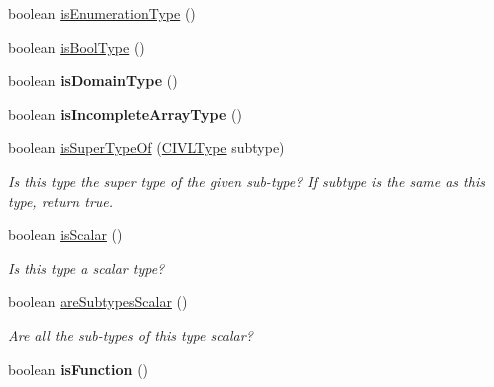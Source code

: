 \begin{DoxyCompactItemize}
boolean \hyperlink{classedu_1_1udel_1_1cis_1_1vsl_1_1civl_1_1model_1_1common_1_1type_1_1CommonType_ae9cfcaa4efb6acb13c7e1f817f3e49a4}{is\+Enumeration\+Type} ()
\item 
boolean \hyperlink{classedu_1_1udel_1_1cis_1_1vsl_1_1civl_1_1model_1_1common_1_1type_1_1CommonType_a5d39059f524a3eee06aa1b9141c5b8c1}{is\+Bool\+Type} ()
\item 
\hypertarget{classedu_1_1udel_1_1cis_1_1vsl_1_1civl_1_1model_1_1common_1_1type_1_1CommonType_a34e43921755bba4604d7af4d115d60d7}{}boolean {\bfseries is\+Domain\+Type} ()\label{classedu_1_1udel_1_1cis_1_1vsl_1_1civl_1_1model_1_1common_1_1type_1_1CommonType_a34e43921755bba4604d7af4d115d60d7}

\item 
\hypertarget{classedu_1_1udel_1_1cis_1_1vsl_1_1civl_1_1model_1_1common_1_1type_1_1CommonType_a9ffa2150d1dee7fbbe569e8c137325a0}{}boolean {\bfseries is\+Incomplete\+Array\+Type} ()\label{classedu_1_1udel_1_1cis_1_1vsl_1_1civl_1_1model_1_1common_1_1type_1_1CommonType_a9ffa2150d1dee7fbbe569e8c137325a0}

\item 
boolean \hyperlink{classedu_1_1udel_1_1cis_1_1vsl_1_1civl_1_1model_1_1common_1_1type_1_1CommonType_a67017012c5ca1fc1586041055d7769b0}{is\+Super\+Type\+Of} (\hyperlink{interfaceedu_1_1udel_1_1cis_1_1vsl_1_1civl_1_1model_1_1IF_1_1type_1_1CIVLType}{C\+I\+V\+L\+Type} subtype)
\begin{DoxyCompactList}\small\item\em Is this type the super type of the given sub-\/type? If subtype is the same as this type, return true. \end{DoxyCompactList}\item 
boolean \hyperlink{classedu_1_1udel_1_1cis_1_1vsl_1_1civl_1_1model_1_1common_1_1type_1_1CommonType_a4ac1aa331a9d49338f718038f51df2f8}{is\+Scalar} ()
\begin{DoxyCompactList}\small\item\em Is this type a scalar type? \end{DoxyCompactList}\item 
boolean \hyperlink{classedu_1_1udel_1_1cis_1_1vsl_1_1civl_1_1model_1_1common_1_1type_1_1CommonType_a6f47a50e9964e78df245b60b4ddbf81c}{are\+Subtypes\+Scalar} ()
\begin{DoxyCompactList}\small\item\em Are all the sub-\/types of this type scalar? \end{DoxyCompactList}\item 
\hypertarget{classedu_1_1udel_1_1cis_1_1vsl_1_1civl_1_1model_1_1common_1_1type_1_1CommonType_abbb32350da799f50769f6e2d46d0e906}{}boolean {\bfseries is\+Function} ()\label{classedu_1_1udel_1_1cis_1_1vsl_1_1civl_1_1model_1_1common_1_1type_1_1CommonType_abbb32350da799f50769f6e2d46d0e906}

\end{DoxyCompactItemize}
